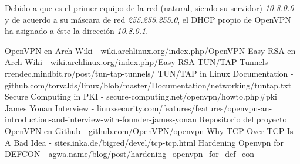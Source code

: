 \documentclass[a4paper, 11pt, titlepage]{article}
\begin{document}
        Debido a que es el primer equipo de la red (natural, siendo su servidor)
        \textit{10.8.0.0} y de acuerdo a su máscara de red \textit{255.255.255.0}, el DHCP 
        propio de OpenVPN ha asignado a éste la dirección \textit{10.8.0.1}.



\newpage
\begin{thebibliography}{X}
    \bibitem{} OpenVPN en Arch Wiki - wiki.archlinux.org/index.php/OpenVPN
    \bibitem{} Easy-RSA en Arch Wiki - wiki.archlinux.org/index.php/Easy-RSA
    \bibitem{} TUN/TAP Tunnels - rrendec.mindbit.ro/post/tun-tap-tunnels/
    \bibitem{} TUN/TAP in Linux Documentation - github.com/torvalds/linux/blob/master/Documentation/networking/tuntap.txt
    \bibitem{} Secure Computing in PKI - secure-computing.net/openvpn/howto.php\#pki
    \bibitem{} James Yonan Interview - linuxsecurity.com/features/features/openvpn-an-introduction-and-interview-with-founder-james-yonan
    \bibitem{} Repositorio del proyecto OpenVPN en Github - github.com/OpenVPN/openvpn
    \bibitem{} Why TCP Over TCP Is A Bad Idea - sites.inka.de/bigred/devel/tcp-tcp.html
    \bibitem{} Hardening Openvpn for DEFCON - agwa.name/blog/post/hardening\_openvpn\_for\_def\_con
\end{thebibliography}
\end{document}
